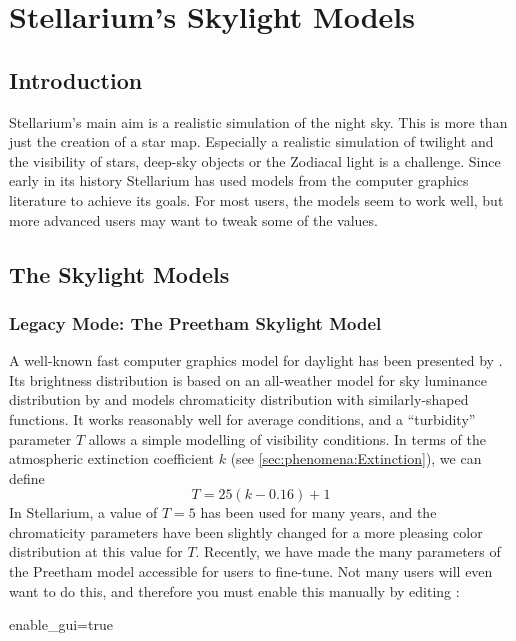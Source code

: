 
\chapter{Stellarium's Skylight Models}
\label{ch:skylight}

\section{Introduction}
\label{sec:skylight:introduction}

Stellarium's main aim is a realistic simulation of the night sky. This
is more than just the creation of a star map. Especially a realistic
simulation of twilight and the visibility of stars, deep-sky objects
or the Zodiacal light is a challenge. Since early in its history
Stellarium has used models from the computer graphics literature to
achieve its goals. For most users, the models seem to work well, but
more advanced users may want to tweak some of the values.

\section{The Skylight Models}
\subsection{Legacy Mode: The Preetham Skylight Model}
\label{sec:skylight:Preetham}

A well-known fast computer graphics model for daylight has been
presented by \citet{Preetham:1999}. Its brightness distribution is
based on an all-weather model for sky luminance distribution by
\citet{Perez:1993} and models chromaticity distribution with
similarly-shaped functions. It works reasonably well for average
conditions, and a ``turbidity'' parameter $T$ allows a simple
modelling of visibility conditions. In terms of the atmospheric
extinction coefficient $k$ (see \ref{sec:phenomena:Extinction}), we
can define
\begin{equation}
  T=25(k-0.16)+1
  \label{eq:TfromK}
\end{equation}
In Stellarium, a value of $T=5$ has been used for many years, and the
chromaticity parameters have been slightly changed for a more pleasing
color distribution at this value for $T$. Recently,
 we have made the many parameters of the Preetham
model accessible for users to fine-tune. Not many users will even want to do this,
and therefore you must enable this manually by editing :
\begin{configfile}
  [Skylight]
  enable_gui=true
\end{configfile}

